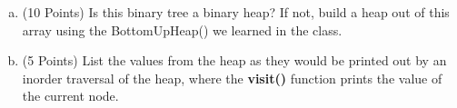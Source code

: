 \documentclass{article}
\begin{document}
\begin{enumerate}
\begin{enumerate}[(a)]
\item (10 Points) Is this binary tree a binary heap? If not, build a heap
out of this array using the BottomUpHeap() we learned in the class. 


\item (5 Points) List the values from the heap as they would be printed
out by an inorder traversal of the heap, where the \textbf{visit()} function
prints the value of the current node. \\


\end{enumerate}
\end{enumerate}                 %
\end{document}

